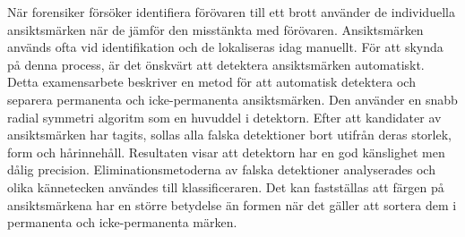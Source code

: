När forensiker försöker identifiera förövaren till ett brott använder de individuella ansiktsmärken när de jämför den misstänkta med förövaren. Ansiktsmärken används ofta vid identifikation och de lokaliseras idag manuellt. För att skynda på denna process, är det önskvärt att detektera ansiktsmärken automatiskt. Detta examensarbete beskriver en metod för att automatisk detektera och separera permanenta och icke-permanenta ansiktsmärken. Den använder en snabb radial symmetri algoritm som en huvuddel i detektorn. Efter att kandidater av ansiktsmärken har tagits, sollas alla falska detektioner bort utifrån deras storlek, form och hårinnehåll. Resultaten visar att detektorn har en god känslighet men dålig precision. Eliminationsmetoderna av falska detektioner analyserades och olika kännetecken användes till klassificeraren. Det kan fastställas att färgen på ansiktsmärkena har en större betydelse än formen när det gäller att sortera dem i permanenta och icke-permanenta märken.